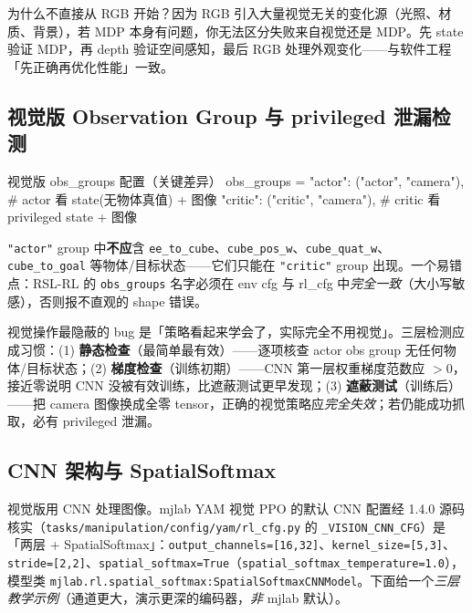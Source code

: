 为什么不直接从 RGB 开始？因为 RGB 引入大量视觉无关的变化源（光照、材质、背景），若 MDP 本身有问题，你无法区分失败来自视觉还是 MDP。先 state 验证 MDP，再 depth 验证空间感知，最后 RGB 处理外观变化——与软件工程「先正确再优化性能」一致。

\subsection{视觉版 Observation Group 与 privileged 泄漏检测}
\label{sec:rlmc-manip-leak}

\begin{codebox}[Python]{视觉版 obs\_groups 配置（关键差异）}
obs_groups = {
    "actor":  ("actor", "camera"),   # actor 看 state(无物体真值) + 图像
    "critic": ("critic", "camera"),  # critic 看 privileged state + 图像
}
\end{codebox}

\verb|"actor"| group 中\textbf{不应}含 \verb|ee_to_cube|、\verb|cube_pos_w|、\verb|cube_quat_w|、\verb|cube_to_goal| 等物体/目标状态——它们只能在 \verb|"critic"| group 出现。一个易错点：RSL-RL 的 \verb|obs_groups| 名字必须在 env cfg 与 rl\_cfg 中\emph{完全一致}（大小写敏感），否则报不直观的 shape 错误。

\begin{insight}\label{ins:rlmc-manip-leak3}
视觉操作最隐蔽的 bug 是「策略看起来学会了，实际完全不用视觉」。三层检测应成习惯：(1) \textbf{静态检查}（最简单最有效）——逐项核查 actor obs group 无任何物体/目标状态；(2) \textbf{梯度检查}（训练初期）——CNN 第一层权重梯度范数应 $>0$，接近零说明 CNN 没被有效训练，比遮蔽测试更早发现；(3) \textbf{遮蔽测试}（训练后）——把 camera 图像换成全零 tensor，正确的视觉策略应\emph{完全失效}；若仍能成功抓取，必有 privileged 泄漏。
\end{insight}

\subsection{CNN 架构与 SpatialSoftmax}
\label{sec:rlmc-manip-cnn}

视觉版用 CNN 处理图像。mjlab YAM 视觉 PPO 的默认 CNN 配置经 1.4.0 源码核实（\verb|tasks/manipulation/config/yam/rl_cfg.py| 的 \verb|_VISION_CNN_CFG|）是「两层 + SpatialSoftmax」：\verb|output_channels=[16,32]|、\verb|kernel_size=[5,3]|、\verb|stride=[2,2]|、\verb|spatial_softmax=True|（\verb|spatial_softmax_temperature=1.0|），模型类 \verb|mjlab.rl.spatial_softmax:SpatialSoftmaxCNNModel|。下面给一个\emph{三层教学示例}（通道更大，演示更深的编码器，\emph{非} mjlab 默认）。

